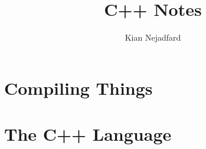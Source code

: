 \documentclass[]{report}
\title{C++ Notes}
\author{Kian Nejadfard}
\begin{document}
\maketitle

\chapter{Compiling Things}
\newpage
    
    
    
\chapter{The C++ Language}
\newpage
    
    
\end{document}
